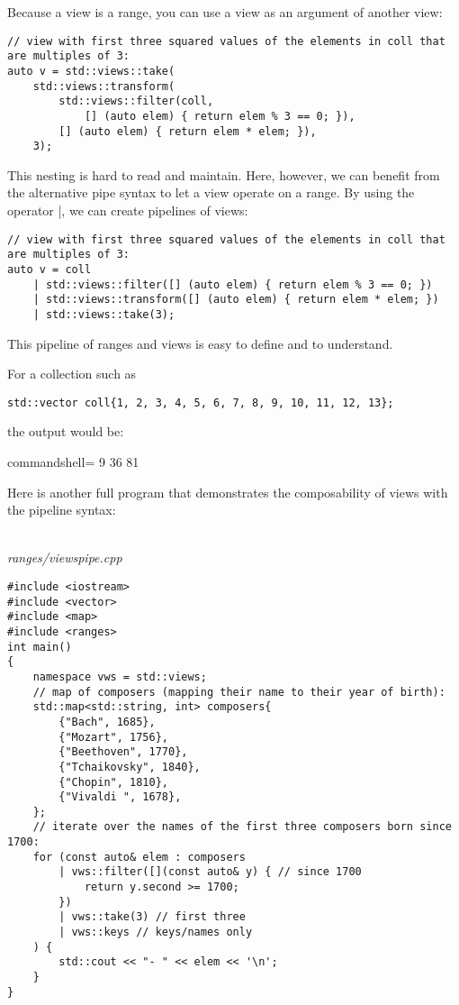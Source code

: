 Because a view is a range, you can use a view as an argument of another view:

\begin{lstlisting}[style=styleCXX]
// view with first three squared values of the elements in coll that are multiples of 3:
auto v = std::views::take(
	std::views::transform(
		std::views::filter(coll,
			[] (auto elem) { return elem % 3 == 0; }),
		[] (auto elem) { return elem * elem; }),
	3);
\end{lstlisting}

This nesting is hard to read and maintain. Here, however, we can benefit from the alternative pipe syntax to let a view operate on a range. By using the operator |, we can create pipelines of views:

\begin{lstlisting}[style=styleCXX]
// view with first three squared values of the elements in coll that are multiples of 3:
auto v = coll
	| std::views::filter([] (auto elem) { return elem % 3 == 0; })
	| std::views::transform([] (auto elem) { return elem * elem; })
	| std::views::take(3);
\end{lstlisting}

This pipeline of ranges and views is easy to define and to understand.

For a collection such as

\begin{lstlisting}[style=styleCXX]
std::vector coll{1, 2, 3, 4, 5, 6, 7, 8, 9, 10, 11, 12, 13};
\end{lstlisting}

the output would be:

\begin{tcblisting}{commandshell={}}
9 36 81
\end{tcblisting}

Here is another full program that demonstrates the composability of views with the pipeline syntax:

\noindent
\hspace*{\fill} \\ %
\textit{ranges/viewspipe.cpp}

\begin{lstlisting}[style=styleCXX]
#include <iostream>
#include <vector>
#include <map>
#include <ranges>
int main()
{
	namespace vws = std::views;
	// map of composers (mapping their name to their year of birth):
	std::map<std::string, int> composers{
		{"Bach", 1685},
		{"Mozart", 1756},
		{"Beethoven", 1770},
		{"Tchaikovsky", 1840},
		{"Chopin", 1810},
		{"Vivaldi ", 1678},
	};
	// iterate over the names of the first three composers born since 1700:
	for (const auto& elem : composers
		| vws::filter([](const auto& y) { // since 1700
			return y.second >= 1700;
		})
		| vws::take(3) // first three
		| vws::keys // keys/names only
	) {
		std::cout << "- " << elem << '\n';
	}
}
\end{lstlisting}

